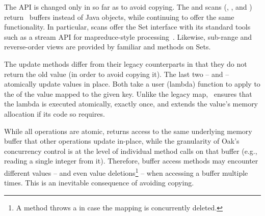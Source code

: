 The API is changed only in so far as to avoid copying. The   and  scans 
(, , and )  return \oak\ buffers instead of Java objects,
while continuing to offer the same functionality. In particular, scans offer the Set interface
with its  standard tools such as a stream API for mapreduce-style processing~\cite{JavaStream}.  Likewise, sub-range and reverse-order views 
are provided by familiar  and  methods on Sets. 



The update methods 
differ from their legacy counterparts   
in that they do not return the old value (in order to avoid  copying it). %
The last two --   and   --  atomically update values in place. 
Both take a user (lambda) function to apply to the   of the value mapped to the given key.
Unlike the legacy map, 
\oak\ ensures that the lambda is executed atomically, exactly once, and extends the value's memory allocation if its code so requires.


While all operations are atomic,   returns access to the same underlying memory buffer that %
other operations update in-place, while the granularity of Oak's concurrency control is at the level of individual method calls on that buffer
(e.g., reading a single integer from it). Therefore,  buffer access methods may encounter different values -- 
and even value deletions\footnote{\small{A   method  throws a     in case the mapping is concurrently deleted.}} -- 
when accessing a buffer %
multiple times. This is an inevitable consequence of avoiding copying.

